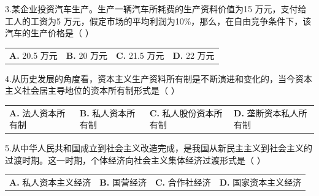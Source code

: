 \documentclass[UTF8,11pt]{ctexart}
\begin{document}
3.某企业投资汽车生产。生产一辆汽车所耗费的生产资料价值为15 万元，支付给工人的工资为5 万元，假定市场的平均利润为10\%，那么，在自由竞争条件下，该汽车的生产价格是（  ）


\begin{center}\begin{tabular}{>{\raggedright\arraybackslash}p{\dimexpr(\linewidth-8\tabcolsep)/4\relax}>{\raggedright\arraybackslash}p{\dimexpr(\linewidth-8\tabcolsep)/4\relax}>{\raggedright\arraybackslash}p{\dimexpr(\linewidth-8\tabcolsep)/4\relax}>{\raggedright\arraybackslash}p{\dimexpr(\linewidth-8\tabcolsep)/4\relax}}
\textbf{A.} 20.\allowbreak{}5 万元 & \textbf{B.} 20 万元 & \textbf{C.} 21.\allowbreak{}5 万元 & \textbf{D.} 22 万元\\[.35em]\end{tabular}\end{center}

4.从历史发展的角度看，资本主义生产资料所有制是不断演进和变化的，当今资本主义社会居主导地位的资本所有制形式是（  ）


\begin{center}\begin{tabular}{>{\raggedright\arraybackslash}p{\dimexpr(\linewidth-8\tabcolsep)/4\relax}>{\raggedright\arraybackslash}p{\dimexpr(\linewidth-8\tabcolsep)/4\relax}>{\raggedright\arraybackslash}p{\dimexpr(\linewidth-8\tabcolsep)/4\relax}>{\raggedright\arraybackslash}p{\dimexpr(\linewidth-8\tabcolsep)/4\relax}}
\textbf{A.} 法人资本所有制 & \textbf{B.} 私人资本所有制 & \textbf{C.} 私人股份资本所有制 & \textbf{D.} 垄断资本私人所有制\\[.35em]\end{tabular}\end{center}

5.从中华人民共和国成立到社会主义改造完成，是我国从新民主主义到社会主义的过渡时期。这一时期，个体经济向社会主义集体经济过渡形式是（  ）


\begin{center}\begin{tabular}{>{\raggedright\arraybackslash}p{\dimexpr(\linewidth-8\tabcolsep)/4\relax}>{\raggedright\arraybackslash}p{\dimexpr(\linewidth-8\tabcolsep)/4\relax}>{\raggedright\arraybackslash}p{\dimexpr(\linewidth-8\tabcolsep)/4\relax}>{\raggedright\arraybackslash}p{\dimexpr(\linewidth-8\tabcolsep)/4\relax}}
\textbf{A.} 私人资本主义经济 & \textbf{B.} 国营经济 & \textbf{C.} 合作社经济 & \textbf{D.} 国家资本主义经济\\[.35em]\end{tabular}\end{center}
\end{document}
